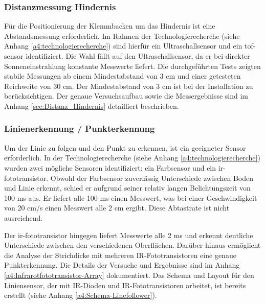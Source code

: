\documentclass[../main.tex]{subfiles}
\begin{document}
\subsubsection{Distanzmessung Hindernis}
Für die Positionierung der Klemmbacken um das Hindernis ist eine Abstandsmessung erforderlich. Im Rahmen der Technologierecherche (siehe Anhang \ref{a4:technologierecherche}) sind hierfür ein Ultraschallsensor und ein \acrshort{tof-sensor} identifiziert. Die Wahl fällt auf den Ultraschallsensor, da er bei direkter Sonneneinstrahlung konstante Messwerte liefert. Die durchgeführten Tests zeigten stabile Messungen ab einem Mindestabstand von 3 cm und einer getesteten Reichweite von 30 cm. Der Mindestabstand von 3 cm ist bei der Installation zu berücksichtigen. Der genaue Versuchsaufbau sowie die Messergebnisse sind im Anhang \ref{sec:Distanz_Hindernis} detailliert beschrieben.

\subsubsection{Linienerkennung / Punkterkennung}
Um der Linie zu folgen und den Punkt zu erkennen, ist ein geeigneter Sensor erforderlich. In der Technologierecherche (siehe Anhang \ref{a4:technologierecherche}) wurden zwei mögliche Sensoren identifiziert: ein Farbsensor und ein \gls{ir-fototransistor}. Obwohl der Farbsensor zuverlässig Unterschiede zwischen Boden und Linie erkennt, schied er aufgrund seiner relativ langen Belichtungszeit von 100 ms aus. Er liefert alle 100 ms einen Messwert, was bei einer Geschwindigkeit von 20 cm/s einen Messwert alle 2 cm ergibt. Diese Abtastrate ist nicht ausreichend.

Der \gls{ir-fototransistor} hingegen liefert Messwerte alle 2 ms und erkennt deutliche Unterschiede zwischen den verschiedenen Oberflächen. Darüber hinaus ermöglicht die Analyse der Strichdicke mit mehreren IR-Fototransistoren eine genaue Punkterkennung. Die Details der Versuche und Ergebnisse sind im Anhang \ref{a4:Infrarotfototransistor-Array} dokumentiert.
Das Schema und Layout für den Liniensensor, der mit IR-Dioden und IR-Fototransistoren arbeitet, ist bereits erstellt (siehe Anhang \ref{a4:Schema-Linefollower}).
\end{document}
